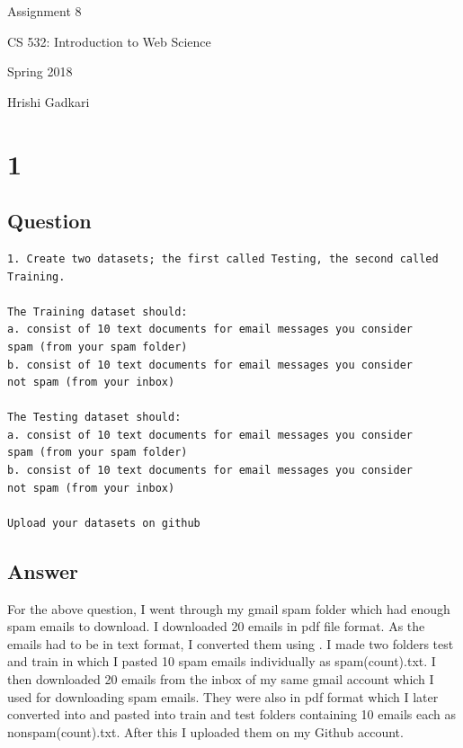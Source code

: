 \documentclass[letterpaper,11pt]{article}
\begin{document}
\begin{titlepage}

\begin{center}

\Huge{Assignment 8}

\Large{CS 532:  Introduction to Web Science}

\Large{Spring 2018}

\Large{Hrishi Gadkari}



\end{center}

\end{titlepage}

\newpage


\section*{1}


\subsection*{Question}

\begin{verbatim}
1. Create two datasets; the first called Testing, the second called Training. 
	
The Training dataset should:
a. consist of 10 text documents for email messages you consider 
spam (from your spam folder)
b. consist of 10 text documents for email messages you consider 
not spam (from your inbox)

The Testing dataset should:
a. consist of 10 text documents for email messages you consider 
spam (from your spam folder)
b. consist of 10 text documents for email messages you consider 
not spam (from your inbox)

Upload your datasets on github

\end{verbatim}
\clearpage
\subsection*{Answer}

For the above question, I went through my gmail spam folder which had enough spam emails to download. I downloaded 20 emails in pdf file format. As the emails had to be in text format, I converted them using \cite{pdftext}. I made two folders test and train in which I pasted 10 spam emails individually as spam(count).txt. I then downloaded 20 emails from the inbox of my same gmail account which I used for downloading spam emails. They were also in pdf format which I later converted into \cite{pdftext} and pasted into train and test folders containing 10 emails each as nonspam(count).txt. After this I uploaded them on my Github account\cite{gitref}.
\end{document}

